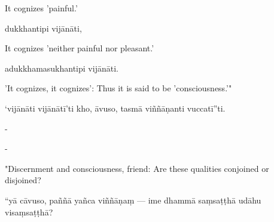 \begin{samepage}
\begin{leftcolumn*}
It cognizes 'painful.'
\end{leftcolumn*}

\begin{rightcolumn}
dukkhantipi vijānāti,
\end{rightcolumn}
\end{samepage}

\begin{samepage}
\begin{leftcolumn*}
It cognizes 'neither painful nor pleasant.'
\end{leftcolumn*}

\begin{rightcolumn}
adukkhamasukhantipi vijānāti.
\end{rightcolumn}
\end{samepage}

\begin{samepage}
\begin{leftcolumn*}
'It cognizes, it cognizes': Thus it is said to be 'consciousness.'"
\end{leftcolumn*}

\begin{rightcolumn}
‘vijānāti vijānātī’ti kho, āvuso, tasmā viññāṇanti vuccatī”ti.
\end{rightcolumn}
\end{samepage}

\begin{samepage}
\begin{leftcolumn*}
-
\end{leftcolumn*}

\begin{rightcolumn}
-
\end{rightcolumn}
\end{samepage}

\begin{samepage}
\begin{leftcolumn*}
"Discernment and consciousness, friend: Are these qualities conjoined or disjoined?
\end{leftcolumn*}

\begin{rightcolumn}
“yā cāvuso, paññā yañca viññāṇaṃ — ime dhammā saṃsaṭṭhā udāhu visaṃsaṭṭhā?
\end{rightcolumn}
\end{samepage}

